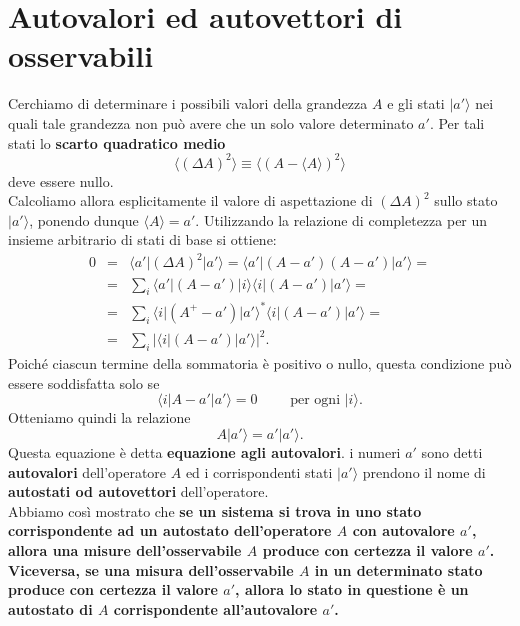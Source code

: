 \section{Autovalori ed autovettori di osservabili}
Cerchiamo di determinare i possibili valori della grandezza $A$ e gli stati $\vert a' \rangle$ nei quali tale grandezza non può avere che un solo valore determinato $a'$. Per tali stati lo \textbf{scarto quadratico medio} 
\begin{equation}
\langle \left( \Delta A \right) ^2 \rangle \equiv \langle \left( A- \langle A\rangle \right) ^2 \rangle
\end{equation}
deve essere nullo.\\
Calcoliamo allora esplicitamente il valore di aspettazione di $(\Delta A )^2$ sullo stato $\vert a' \rangle$, ponendo dunque $\langle A \rangle = a'$. Utilizzando la relazione di completezza per un insieme arbitrario di stati di base si ottiene:
\begin{eqnarray}
0 & = & \langle a' \vert (\Delta A )^2 \vert a'\rangle = \langle a' \vert (A-a' )(A-a') \vert a'\rangle= \nonumber \\
& = & \sum _i \langle a' \vert (A-a' ) \vert i \rangle \langle i \vert (A-a' ) \vert a' \rangle = \\
& = & \sum _i \langle i \vert (A^{+}-a' ) \vert a' \rangle ^* \langle i \vert (A-a' ) \vert a' \rangle = \nonumber \\
& = & \sum _i \vert \langle i \vert (A-a' ) \vert a' \rangle \vert ^2.\nonumber
\end{eqnarray}
Poiché ciascun termine della sommatoria è positivo o nullo, questa condizione può essere soddisfatta solo se
\begin{equation}
\langle i \vert A-a' \vert a' \rangle =0 \qquad \textrm{ per ogni } \vert i \rangle .
\end{equation}
Otteniamo quindi la relazione
\begin{equation}
A \vert a' \rangle =a' \vert a' \rangle .
\end{equation}
Questa equazione è detta \textbf{equazione agli autovalori}. i numeri $a'$ sono detti \textbf{autovalori} dell'operatore $A$ ed i corrispondenti stati $\vert a' \rangle $ prendono il nome di \textbf{autostati od autovettori} dell'operatore.\\
Abbiamo così mostrato che \textbf{se un sistema si trova in uno stato corrispondente ad un autostato dell'operatore $A$ con autovalore $a'$, allora una misure dell'osservabile $A$ produce con certezza il valore $a'$. Viceversa, se una misura dell'osservabile $A$ in un determinato stato produce con certezza il valore $a'$, allora lo stato in questione è un autostato di $A$ corrispondente all'autovalore $a'$.}\\

